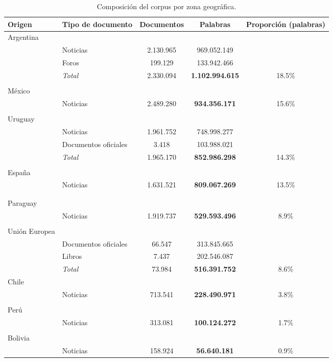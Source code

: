 \begin{table*}[t]
    \centering
    \begin{tabular}{llccc}
        \hline
        Origen & Tipo de documento & Documentos & Palabras & Proporción (palabras)\\
        \hline
        Argentina\\
         & Noticias & 2.130.965 & 969.052.149\\
         & Foros & 199.129 & 133.942.466\\
         & \textit{Total} & 2.330.094 & \textbf{1.102.994.615} & 18.5\%\\
        \\
        México\\
         & Noticias & 2.489.280 & \textbf{934.356.171} & 15.6\%\\
        \\
        Uruguay\\
         & Noticias & 1.961.752 & 748.998.277\\
         & Documentos oficiales & 3.418 & 103.988.021\\
         & \textit{Total} & 1.965.170 & \textbf{852.986.298} & 14.3\%\\
        \\
        España\\
         & Noticias & 1.631.521 & \textbf{809.067.269} & 13.5\%\\
        \\
        \\
        Paraguay\\
         & Noticias & 1.919.737 & \textbf{529.593.496} & 8.9\%\\
        \\
        Unión Europea\\
         & Documentos oficiales & 66.547 & 313.845.665\\
         & Libros & 7.437 & 202.546.087\\
         & \textit{Total} & 73.984 & \textbf{516.391.752} & 8.6\%\\
        Chile\\
         & Noticias & 713.541 & \textbf{228.490.971} & 3.8\%\\
        \\
        Perú\\
         & Noticias & 313.081 & \textbf{100.124.272} & 1.7\%\\
        \\
        Bolivia\\
         & Noticias & 158.924 & \textbf{56.640.181} & 0.9\%\\
        \hline
    \end{tabular}
    \caption{Composición del corpus por zona geográfica.}
    \label{table:corpus_country}
\end{table*}

